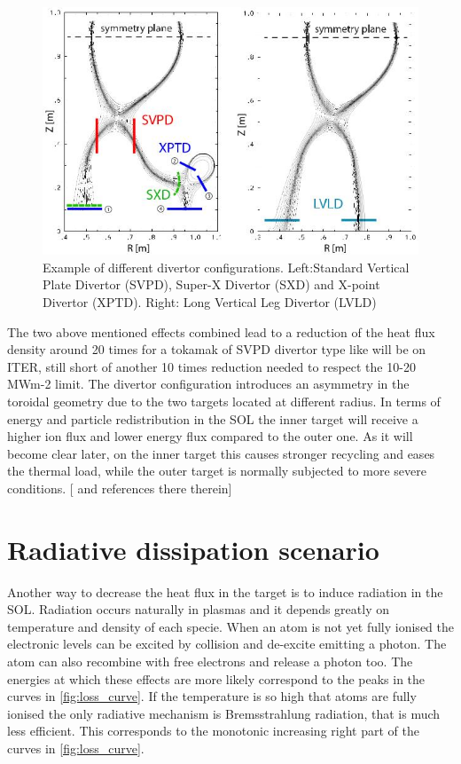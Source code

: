 \begin{figure}
	\centering
	\includegraphics[width=\linewidth]{Chapters/chapter1/figs/divertor geometry.jpg}
	\caption{Example of different divertor configurations. Left:Standard Vertical Plate Divertor (SVPD), Super-X Divertor (SXD) and X-point Divertor (XPTD). Right: Long Vertical Leg Divertor (LVLD) \cite{Umansky2017}}
	\label{fig:divertor_geometry}
\end{figure}

The two above mentioned effects combined lead to a reduction of the heat flux density around 20 times for a tokamak of SVPD divertor type like will be on ITER, still short of another 10 times reduction needed to respect the 10-20 MWm-2 limit. The divertor configuration introduces an asymmetry in the toroidal geometry due to the two targets located at different radius. In terms of energy and particle redistribution in the SOL the inner target will receive a higher ion flux and lower energy flux compared to the outer one. As it will become clear later, on the inner target this causes stronger recycling and eases the thermal load, while the outer target is normally subjected to more severe conditions. [\cite{Potzel2014} and references there therein]

\section{Radiative dissipation scenario}

Another way to decrease the heat flux in the target is to induce radiation in the SOL.
Radiation occurs naturally in plasmas and it depends greatly on temperature and density of each specie. When an atom is not yet fully ionised the electronic levels can be excited by collision and de-excite emitting a photon. The atom can also recombine with free electrons and release a photon too. The energies at which these effects are more likely correspond to the peaks in the curves in \autoref{fig:loss_curve}. If the temperature is so high that atoms are fully ionised the only radiative mechanism is Bremsstrahlung radiation, that is much less efficient. This corresponds to the monotonic increasing right part of the curves in \autoref{fig:loss_curve}.

